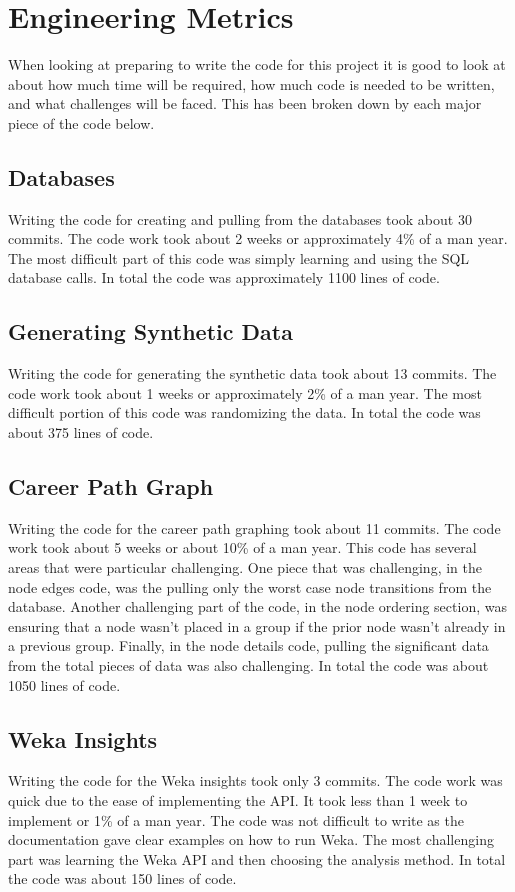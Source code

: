 \section{Engineering Metrics}
\label{sect:engineering-metrics}
When looking at preparing to write the code for this project it is good to look
at about how much time will be required, how much code is needed to be written,
and what challenges will be faced.  This has been broken down by each major
piece of the code below.
\subsection{Databases}
Writing the code for creating and pulling from the databases took about 30
commits.  The code work took about 2 weeks or approximately 4\% of a man year. 
The most difficult part of this code was simply learning and using the SQL
database calls.  In total the code was approximately 1100 lines of code.
\subsection{Generating Synthetic Data}
Writing the code for generating the synthetic data took about 13 commits.  The
code work took about 1 weeks or approximately 2\% of a man year.  The most
difficult portion of this code was randomizing the data.  In total the code was
about 375 lines of code.
\subsection{Career Path Graph}
Writing the code for the career path graphing took about 11 commits.  The code
work took about 5 weeks or about 10\% of a man year.  This code has several
areas that were particular challenging.  One piece that was challenging, in the
node edges code, was the pulling only the worst case node transitions from
the database.  Another challenging part of the code, in the node ordering
section, was ensuring that a node wasn't placed in a group if the prior node
wasn't already in a previous group.  Finally, in the node details code, pulling
the significant data from the total pieces of data was also challenging.  In
total the code was about 1050 lines of code.
\subsection{Weka Insights}
Writing the code for the Weka insights took only 3 commits.  The code work was
quick due to the ease of implementing the API.  It took less than 1 week to
implement or 1\% of a man year.  The code was not difficult to write as the
documentation gave clear examples on how to run Weka.  The most challenging part
was learning the Weka API and then choosing the analysis method.  In total the
code was about 150 lines of code.
